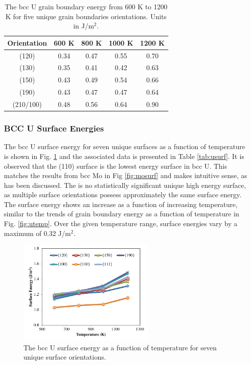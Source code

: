 \documentclass[review]{elsarticle}
\begin{document}
\FloatBarrier

\begin{table}[h]
\caption{The bcc U grain boundary energy from 600 K to 1200 K for five unique grain boundaries orientations. Units in J/m$^{2}$. } \label{tab:utemp}
\begin{center}
\begin{tabular}{|c|c|c|c|c|}
	\hline
	Orientation & 600 K & 800 K & 1000 K & 1200 K \\
	 \hline
	 (120) & 0.34 & 0.47 & 0.55 & 0.70 \\
	 (130) & 0.35 & 0.41 & 0.42 & 0.63 \\
	 (150) & 0.43 & 0.49 & 0.54 & 0.66 \\
	 (190) & 0.43 & 0.47 & 0.47 & 0.64 \\
	 (210/100) & 0.48 & 0.56 & 0.64 & 0.90 \\	 
	 \hline
\end{tabular}
\end{center}
\label{default}
\end{table}

\FloatBarrier


\subsubsection{BCC U Surface Energies}

The bcc U surface energy for seven unique surfaces as a function of temperature is shown in Fig. \ref{fig:usurf} and the associated data is presented in Table \ref{tab:usurf}. It is observed that the (110) surface is the lowest energy surface in bcc U. This matches the results from bcc Mo in Fig \ref{fig:mosurf} and makes intuitive sense, as has been discussed. The is no statistically significant unique high energy surface, as multiple surface orientations possess approximately the same surface energy. The surface energy shows an increase as a function of increasing temperature, similar to the trends of grain boundary energy as a function of temperature in Fig. \ref{fig:utemp}. Over the given temperature range, surface energies vary by a maximum of 0.32 J/m$^{2}$.

\begin{figure}[h]
 \centering
 \includegraphics[width=0.6\textwidth]{usurf.png} 
 \caption{The bcc U surface energy as a function of temperature for seven unique surface orientations.}
 \label{fig:usurf}
\end{figure}
\end{document}
